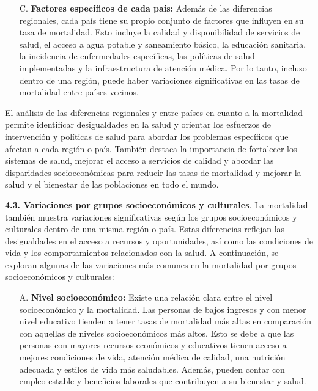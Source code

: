 \documentclass[8pt,a4paper]{beamer}
\begin{document}
{\begin{frame}{}
\begin{block}{}
\begin{enumerate}
\item[C.] \textbf{Factores específicos de cada país:} Además de las diferencias regionales, cada país tiene su propio conjunto de factores que influyen en su tasa de mortalidad. Esto incluye la calidad y disponibilidad de servicios de salud, el acceso a agua potable y saneamiento básico, la educación sanitaria, la incidencia de enfermedades específicas, las políticas de salud implementadas y la infraestructura de atención médica. Por lo tanto, incluso dentro de una región, puede haber variaciones significativas en las tasas de mortalidad entre países vecinos.

\end{enumerate}
El análisis de las diferencias regionales y entre países en cuanto a la mortalidad permite identificar desigualdades en la salud y orientar los esfuerzos de intervención y políticas de salud para abordar los problemas específicos que afectan a cada región o país. También destaca la importancia de fortalecer los sistemas de salud, mejorar el acceso a servicios de calidad y abordar las disparidades socioeconómicas para reducir las tasas de mortalidad y mejorar la salud y el bienestar de las poblaciones en todo el mundo.
\end{block}
\end{frame}


\begin{frame}{}
\setlength{\parskip}{2px}
\justifying
\begin{block}{\textbf{4.3. Variaciones por grupos socioeconómicos y culturales}.}
\setlength{\parskip}{2px}
\justifying
La mortalidad también muestra variaciones significativas según los grupos socioeconómicos y culturales dentro de una misma región o país. Estas diferencias reflejan las desigualdades en el acceso a recursos y oportunidades, así como las condiciones de vida y los comportamientos relacionados con la salud. A continuación, se exploran algunas de las variaciones más comunes en la mortalidad por grupos socioeconómicos y culturales:
\begin{enumerate}
\setlength{\parskip}{2px}
\justifying
\item[A.]\textbf{Nivel socioeconómico:} Existe una relación clara entre el nivel socioeconómico y la mortalidad. Las personas de bajos ingresos y con menor nivel educativo tienden a tener tasas de mortalidad más altas en comparación con aquellas de niveles socioeconómicos más altos. Esto se debe a que las personas con mayores recursos económicos y educativos tienen acceso a mejores condiciones de vida, atención médica de calidad, una nutrición adecuada y estilos de vida más saludables. Además, pueden contar con empleo estable y beneficios laborales que contribuyen a su bienestar y salud.


\end{enumerate}
\end{block}
\end{frame}}
\end{document}
